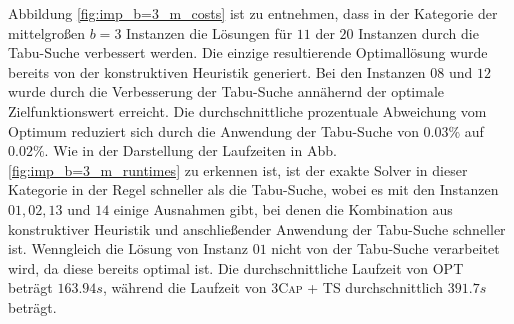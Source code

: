 Abbildung \ref{fig:imp_b=3_m_costs} ist zu entnehmen, dass in der Kategorie der mittelgroßen $b = 3$ Instanzen
die Lösungen für $11$ der $20$ Instanzen durch die Tabu-Suche verbessert werden.
Die einzige resultierende Optimallösung wurde bereits von der konstruktiven Heuristik generiert.
Bei den Instanzen $08$ und $12$ wurde durch die Verbesserung der Tabu-Suche annähernd der optimale
Zielfunktionswert erreicht. Die durchschnittliche prozentuale Abweichung vom Optimum reduziert sich
durch die Anwendung der Tabu-Suche von $0.03 \%$ auf $0.02 \%$.
Wie in der Darstellung der Laufzeiten in Abb. \ref{fig:imp_b=3_m_runtimes} zu erkennen ist,
ist der exakte Solver in dieser Kategorie in der Regel schneller als die Tabu-Suche, wobei es mit
den Instanzen $01, 02, 13$ und $14$ einige Ausnahmen gibt, bei denen die Kombination aus konstruktiver Heuristik
und anschließender Anwendung der Tabu-Suche schneller ist. Wenngleich die Lösung von Instanz $01$ nicht von der
Tabu-Suche verarbeitet wird, da diese bereits optimal ist. Die durchschnittliche Laufzeit von \textsc{OPT}
beträgt $163.94s$, während die Laufzeit von \textsc{3Cap + TS} durchschnittlich $391.7s$ beträgt.

